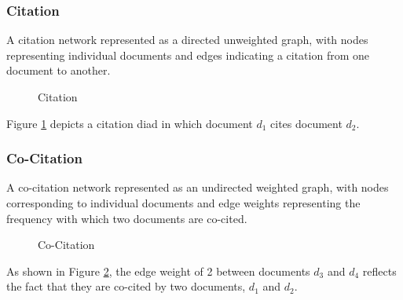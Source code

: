 
\subsubsection{Citation}

A citation network represented as a directed unweighted graph, with nodes representing individual documents and edges indicating a citation from one document to another.

\begin{figure}[H]
    \centering
    \caption{Citation} \label{fig:citation}
\end{figure}

Figure \ref{fig:citation} depicts a citation diad in which document $d_1$ cites document $d_2$.

\subsubsection{Co-Citation}

A co-citation network represented as an undirected weighted graph, with nodes corresponding to individual documents and edge weights representing the frequency with which two documents are 
co-cited.

\begin{figure}[H]
    \centering
    \caption{Co-Citation} \label{fig:co_citation}
\end{figure}

As shown in Figure \ref{fig:co_citation}, the edge weight of 2 between documents $d_3$ and $d_4$ reflects the fact that they are co-cited by two documents, $d_1$ and $d_2$.

